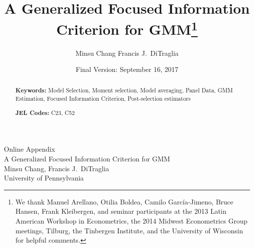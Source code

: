 \documentclass[12pt]{article}
\begin{document}
\title{A Generalized Focused Information Criterion for GMM\footnote{We thank Manuel Arellano, Otilia Boldea, Camilo Garc\'{i}a-Jimeno, Bruce Hansen, Frank Kleibergen, and seminar participants at the 2013 Latin American Workshop in Econometrics, the 2014 Midwest Econometrics Group meetings, Tilburg, the Tinbergen Institute, and the University of Wisconsin for helpful comments.}} 

\author{Minsu Chang \hspace{1em} Francis J.\ DiTraglia}

\date{\footnotesize Final Version: September 16, 2017}

\maketitle 
\begin{abstract}
  \singlespacing
	

	\bigskip
	\noindent\textbf{Keywords:} 
  Model Selection, Moment selection, Model averaging, Panel Data, GMM Estimation, Focused Information Criterion, Post-selection estimators

	\medskip
	\noindent\textbf{JEL Codes:} C23, C52 
\end{abstract}










\singlespacing
\small



\appendix


\newpage

\clearpage
\normalsize
{}
\begin{center}
  {\Huge Online Appendix\\}
  \vspace{1em}
  {\Large A Generalized Focused Information Criterion for GMM\\}
  \vspace{2em}
  {\large Minsu Chang, Francis J.\ DiTraglia\\ University of Pennsylvania}
\end{center}

\renewcommand*{\thepage}{Online Appendix - \arabic{page}}
\normalsize




\newpage

\end{document}

